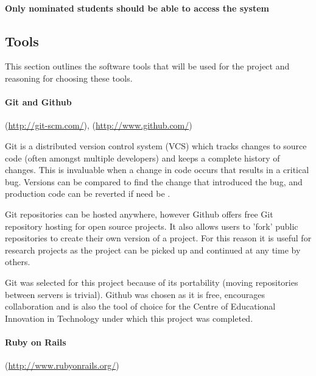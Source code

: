 \paragraph{Only nominated students should be able to access the system}

\subsection{Tools}
This section outlines the software tools that will be used for the project and reasoning for
choosing these tools.
\paragraph{Git and Github}
(\url{http://git-scm.com/}),
(\url{http://www.github.com/})

Git is a distributed version control system (VCS) which tracks changes
to source code (often amongst multiple developers) and keeps a complete history
of changes. This is invaluable when a change in code occurs that results in a critical
bug. Versions can be compared to find the change that introduced the bug, and production
code can be reverted if need be \cite{scott_chacon_pro_2009}.

Git repositories can be hosted anywhere, however Github offers free Git repository hosting
for open source projects. It also allows
users to 'fork' public repositories to create their own version of a project. For this
reason it is useful for research projects as the project can be picked up and continued
at any time by others.

Git was selected for this project because of its portability (moving repositories
between servers is trivial). Github was chosen as it is free, encourages collaboration and is also the tool of choice for the 
Centre of Educational Innovation in Technology \cite{zornig_ceit_2012} under which this project was completed. 

\paragraph{Ruby on Rails}
(\url{http://www.rubyonrails.org/})

